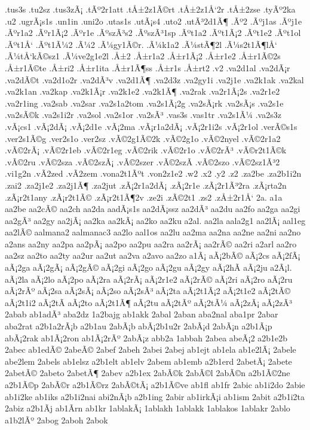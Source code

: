 {.tus3s
.tu2sz
.tus3zÃ¡
.tÃº2r1att
.tÅ±2z1Ã©rt
.tÅ±2z1Å‘2r
.tÅ±2zse
.tyÃº2ka
.u2
.ugrÃ¡s1s
.un1in
.uni2o
.utas1s
.utÃ¡s4
.uto2
.utÃ³2d1Ã¶
.Ãº2
.Ãºj1as
.Ãºj1e
.Ãºr1a2
.Ãºr1Ã¡2
.Ãºr1e
.ÃºszÃ³s2
.ÃºszÃ³1sp
.Ãºt1a2
.Ãºt1Ã¡2
.Ãºt1e2
.Ãºt1ol
.Ãºt1Å‘
.Ãºt1Ã¼2
.Ã¼2
.Ã¼gy1Ã©r.
.Ã¼k1a2
.Ã¼stÃ¶2l
.Ã¼s2t1Ã¶lÅ‘
.Ã¼tÅ‘kÃ©sz1
.Ã¼ve2g1e2l
.Å±2
.Å±r1a2
.Å±r1Ã¡2
.Å±r1e2
.Å±r1Ã©2s
.Å±r1Ã©te
.Å±ri2
.Å±r1ita
.Å±r1Ã¶ss
.Å±r1s
.Å±rt2
.v2
.va2d1al
.va2dÃ¡r
.va2dÃ©t
.va2d1o2r
.va2dÃ³v
.va2d1Ã¶
.va2d3z
.va2gy1i
.va2j1e
.va2k1ak
.va2kal
.va2k1an
.va2kap
.va2k1Ã¡r
.va2k1e2
.va2k1Ã¶
.va2rak
.va2r1Ã¡2s
.va2r1e2
.va2r1ing
.va2sab
.va2sar
.va2s1a2tom
.va2s1Ã¡2g
.va2sÃ¡rk
.va2sÃ¡s
.va2s1e
.va2sÃ©k
.va2s1i2r
.va2sol
.va2s1or
.va2sÃ³
.vas3s
.vas1tr
.va2s1Ã¼
.va2s3z
.vÃ¡cs1
.vÃ¡2dÃ¡
.vÃ¡2d1e
.vÃ¡2ma
.vÃ¡r1a2dÃ¡
.vÃ¡2r1i2s
.vÃ¡2r1ol
.verÃ©s1s
.ver2s1Ã©g
.ver2s1o
.ver2sz
.vÃ©2g1Ã©2k
.vÃ©2g1o
.vÃ©2nyel
.vÃ©2r1a2
.vÃ©2rÃ¡
.vÃ©2r1eb
.vÃ©2r1eg
.vÃ©2rik
.vÃ©2r1o
.vÃ©2rÃ³
.vÃ©r2t1Ã©k
.vÃ©2ru
.vÃ©2sza
.vÃ©2szÃ¡
.vÃ©2szer
.vÃ©2szÃ­
.vÃ©2szo
.vÃ©2sz1Ã³2
.vi1g2n
.vÃ­2zed
.vÃ­2zem
.vona2t1Ãºt
.von2z1e2
.w2
.x2
.y2
.z2
.za2be
.za2b1i2n
.zai2
.za2j1e2
.za2j1Ã¶
.za2jut
.zÃ¡2r1a2dÃ¡
.zÃ¡2r1e
.zÃ¡2r1Ã³2ra
.zÃ¡rta2n
.zÃ¡r2t1any
.zÃ¡r2t1Ã©
.zÃ¡r2t1Ã¶2v
.ze2i
.zÃ©2t1
.zs2
.zÅ±2r1Å‘
2a.
a1a
aa2be
aa2cÃ©
aa2ch
aa2da
aadÃ¡s1s
aa2dÃ¡ssz
aa2dÃ³
aa2du
aa2fo
aa2ga
aa2gi
aa2gÃ³
aa2gy
aa2jÃ¡
aa2ka
aa2kÃ¡
aa2ko
aa2ku
a2al.
aa2la
aala2g1
aa2lÃ¡
aal1eg
aa2lÃ©
aalmana2
aalmanac3
aa2lo
aal1os
aa2lu
aa2ma
aa2na
aa2ne
aa2ni
aa2no
a2ans
aa2ny
aa2pa
aa2pÃ¡
aa2po
aa2pu
aa2ra
aa2rÃ¡
aa2rÃ©
aa2ri
a2arl
aa2ro
aa2sz
aa2to
aa2ty
aa2ur
aa2ut
aa2va
a2avo
aa2zo
a1Ã¡
aÃ¡2bÃ©
aÃ¡2cs
aÃ¡2fÃ¡
aÃ¡2ga
aÃ¡2gÃ¡
aÃ¡2gÃ©
aÃ¡2gi
aÃ¡2go
aÃ¡2gu
aÃ¡2gy
aÃ¡2hÃ­
aÃ¡2ju
a2Ã¡l.
aÃ¡2la
aÃ¡2lo
aÃ¡2po
aÃ¡2ra
aÃ¡2rÃ¡
aÃ¡2r1e2
aÃ¡2rÃ©
aÃ¡2ri
aÃ¡2ro
aÃ¡2ru
aÃ¡2rÃº
aÃ¡2sa
aÃ¡2sÃ¡
aÃ¡2so
aÃ¡2sÃ³
aÃ¡2ta
aÃ¡2t1Ã¡2
aÃ¡2t1e2
aÃ¡2tÃ©
aÃ¡2t1i2
aÃ¡2tÃ­
aÃ¡2to
aÃ¡2t1Ã¶
aÃ¡2tu
aÃ¡2tÃº
aÃ¡2tÃ¼
aÃ¡2zÃ¡
aÃ¡2zÃ³
2abab
ab1adÃ³
aba2dz
1a2bajg
ab1akk
2abal
2aban
aba2nal
aba1pr
2abar
aba2rat
a2b1a2rÃ¡b
a2b1au
2abÃ¡b
abÃ¡2b1u2r
2abÃ¡d
2abÃ¡n
a2b1Ã¡p
abÃ¡2rak
ab1Ã¡2ron
ab1Ã¡2rÃº
2abÃ¡z
abb2a
1abbah
2abea
abeÃ¡2
a2b1e2b
2abec
ab1edÃ©
2abeÃ©
2abef
2abeh
2abei
2abej
ab1ejt
ab1ela
ab1e2lÃ¡
2abele
abe2lem
2abels
ab1elsz
a2b1elt
ab1elv
2abem
ab1emb
a2b1erd
2abetÃ¡
2abete
2abetÃ©
2abeto
2abetÃ¶
2abev
a2b1ex
2abÃ©k
2abÃ©l
2abÃ©n
a2b1Ã©2ne
a2b1Ã©p
2abÃ©r
a2b1Ã©rz
2abÃ©tÃ¡
a2b1Ã©ve
ab1fl
ab1fr
2abic
ab1i2do
2abie
ab1i2ke
ab1iks
a2b1i2nai
abi2nÃ¡b
a2b1ing
2abir
ab1irkÃ¡i
ab1ism
2abit
a2b1i2ta
2abiz
a2b1Ã­j
ab1Ã­rn
ab1kr
1ablakÃ¡
1ablakh
1ablakk
1ablakos
1ablakr
2ablo
a1b2lÃº
2abog
2aboh
2abok
}

